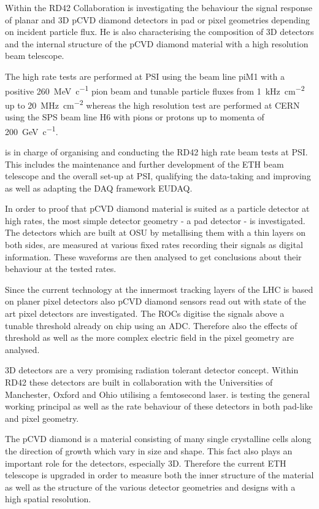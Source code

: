 
Within the RD42 Collaboration \me is investigating the behaviour the signal response of planar and 3D \ac{pCVD} diamond detectors in pad or pixel geometries depending on incident particle flux. He is also characterising the composition of 3D detectors and the internal structure of the \ac{pCVD} diamond material with a high resolution beam telescope.\par
The high rate tests are performed at \ac{PSI} using the beam line piM1 with a positive \SI{260}{\mega\electronvolt\per c} pion beam and tunable particle fluxes from \SI{1}{\kilo\hertz\per\centi\meter^2} up to \SI{20}{\mega\hertz\per\centi\meter^2} whereas the high resolution test are performed at CERN using the SPS beam line H6 with pions or protons up to momenta of \SI{200}{\giga\electronvolt\per c}.\parsmall

\me is in charge of organising and conducting the RD42 high rate beam tests at \ac{PSI}. This includes the maintenance and further development of the ETH beam telescope and the overall set-up at \ac{PSI}, qualifying the data-taking and improving as well as adapting the \ac{DAQ} framework EUDAQ.\par

In order to proof that \ac{pCVD} diamond material is suited as a particle detector at high rates, the most simple detector geometry - a pad detector - is investigated. The detectors which are built at \ac{OSU} by metallising them with a thin layers on both sides, are measured at various fixed rates recording their signals as digital information. These waveforms are then analysed to get conclusions about their behaviour at the tested rates.\par

Since the current technology at the innermost tracking layers of the LHC is based on planer pixel detectors also \ac{pCVD} diamond sensors read out with state of the art pixel detectors are investigated. The \acp{ROC} digitise the signals above a tunable threshold already on chip using an \ac{ADC}. Therefore also the effects of threshold as well as the more complex electric field in the pixel geometry are analysed.\par

3D detectors are a very promising radiation tolerant detector concept. Within RD42 these detectors are built in collaboration with the Universities of Manchester, Oxford and Ohio utilising a femtosecond laser. \me is testing the general working principal as well as the rate behaviour of these detectors in both pad-like and pixel geometry.\parsmall

The \ac{pCVD} diamond is a material consisting of many single crystalline cells along the direction of growth which vary in size and shape. This fact also plays an important role for the detectors, especially 3D. Therefore the current ETH telescope is upgraded in order to measure both the inner structure of the material as well as the structure of the various detector geometries and designs with a high spatial resolution.\parend